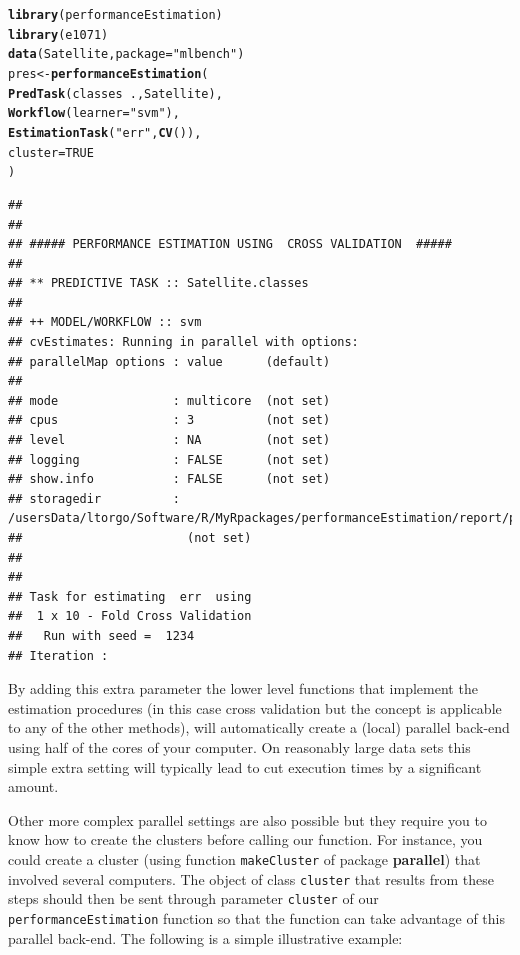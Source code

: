 \documentclass[10pt,a4paper]{article}\usepackage[]{graphicx}\usepackage[]{color}
\makeatletter
\newcommand{\hlnum}[1]{\textcolor[rgb]{0.686,0.059,0.569}{#1}}%
\newcommand{\hlstr}[1]{\textcolor[rgb]{0.192,0.494,0.8}{#1}}%
\newcommand{\hlopt}[1]{\textcolor[rgb]{0,0,0}{#1}}%
\newcommand{\hlstd}[1]{\textcolor[rgb]{0.345,0.345,0.345}{#1}}%
\newcommand{\hlkwb}[1]{\textcolor[rgb]{0.69,0.353,0.396}{#1}}%
\newcommand{\hlkwc}[1]{\textcolor[rgb]{0.333,0.667,0.333}{#1}}%
\newcommand{\hlkwd}[1]{\textcolor[rgb]{0.737,0.353,0.396}{\textbf{#1}}}%
\newenvironment{kframe}{%
 \def\at@end@of@kframe{}%
 \ifinner\ifhmode%
  \def\at@end@of@kframe{\end{minipage}}%
  \begin{minipage}{\columnwidth}%
 \fi\fi%
 \def\FrameCommand##1{\hskip\@totalleftmargin \hskip-\fboxsep
 \colorbox{shadecolor}{##1}\hskip-\fboxsep
     \hskip-\linewidth \hskip-\@totalleftmargin \hskip\columnwidth}%
 \MakeFramed {\advance\hsize-\width
   \@totalleftmargin\z@ \linewidth\hsize
   \@setminipage}}%
 {\par\unskip\endMakeFramed%
 \at@end@of@kframe}
\newenvironment{knitrout}{}{} %
\makeatother
\begin{document}
\begin{knitrout}\small
{}\color{fgcolor}\begin{kframe}
\begin{alltt}
\hlkwd{library}\hlstd{(performanceEstimation)}
\hlkwd{library}\hlstd{(e1071)}
\hlkwd{data}\hlstd{(Satellite,}\hlkwc{package}\hlstd{=}\hlstr{"mlbench"}\hlstd{)}
\hlstd{pres} \hlkwb{<-} \hlkwd{performanceEstimation}\hlstd{(}
    \hlkwd{PredTask}\hlstd{(classes} \hlopt{~} \hlstd{.,Satellite),}
    \hlkwd{Workflow}\hlstd{(}\hlkwc{learner}\hlstd{=}\hlstr{"svm"}\hlstd{),}
    \hlkwd{EstimationTask}\hlstd{(}\hlstr{"err"}\hlstd{,}\hlkwd{CV}\hlstd{()),}
    \hlkwc{cluster}\hlstd{=}\hlnum{TRUE}
    \hlstd{)}
\end{alltt}
\begin{verbatim}
## 
## 
## ##### PERFORMANCE ESTIMATION USING  CROSS VALIDATION  #####
## 
## ** PREDICTIVE TASK :: Satellite.classes
## 
## ++ MODEL/WORKFLOW :: svm 
## cvEstimates: Running in parallel with options:
## parallelMap options : value      (default)
## 
## mode                : multicore  (not set)
## cpus                : 3          (not set)
## level               : NA         (not set)
## logging             : FALSE      (not set)
## show.info           : FALSE      (not set)
## storagedir          : /usersData/ltorgo/Software/R/MyRpackages/performanceEstimation/report/packageVignette
##                       (not set)
## 
## 
## Task for estimating  err  using
##  1 x 10 - Fold Cross Validation
## 	 Run with seed =  1234 
## Iteration :
\end{verbatim}
\end{kframe}
\end{knitrout}

By adding this extra parameter the lower level functions that implement the estimation procedures (in this case cross validation but the concept is applicable to any of the other methods), will automatically create a (local) parallel back-end using half of the cores of your computer. On reasonably large data sets this simple extra setting will typically lead to cut execution times by a significant amount. 

Other more complex parallel settings are also possible but they require you to know how to create the clusters before calling our function. For instance, you could create a cluster (using function \texttt{makeCluster} of package \textbf{parallel}) that involved several computers. The object of class \texttt{cluster} that results from these steps should then be sent through parameter \texttt{cluster} of our \texttt{performanceEstimation} function so that the function can take advantage of this parallel back-end. The following is a simple illustrative example:
\end{document}

